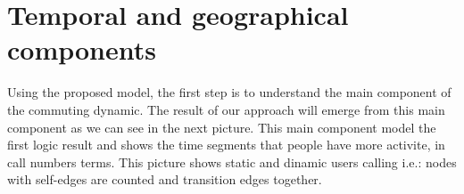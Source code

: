 \newpage

\section{Temporal and geographical components}

Using the proposed model, the first step is to understand the main component of the commuting dynamic. The result of our approach will emerge from this main component as we can see in the next picture. This main component model the first logic result and shows the time segments that people have more activite, in call numbers terms. This picture shows static and dinamic users calling i.e.: nodes with self-edges are counted and transition edges together.

\begin{figure}[ht]
\centering
{}
\label{fig:fig1}
\end{figure}

